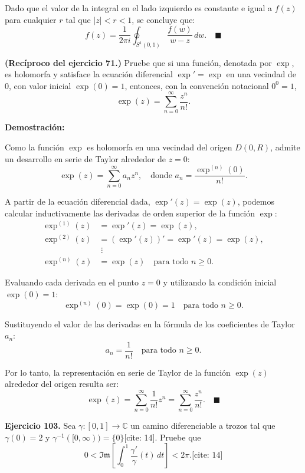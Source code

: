 \documentclass[11pt,a4paper]{article}
\theoremstyle{definition}
\theoremstyle{plain}
\theoremstyle{remark}
\begin{document}
	Dado que el valor de la integral en el lado izquierdo es constante e igual a $f(z)$ para cualquier $r$ tal que $|z| < r < 1$, se concluye que:
	\[
	f(z) = \frac{1}{2\pi i} \oint_{S^1(0, 1)} \frac{f(w)}{w - z} \, dw. \quad \blacksquare
	\]
	
	\noindent \textbf{(Recíproco del ejercicio 71.)} Pruebe que si una función, denotada por $\exp$, es holomorfa y satisface la ecuación diferencial $\exp' = \exp$ en una vecindad de $0$, con valor inicial $\exp(0) = 1$, entonces, con la convención notacional $0^0 = 1$,
	\[
	\exp(z) = \sum_{n=0}^{\infty} \frac{z^n}{n!}.
	\]
	
	\vspace{1em}
	\noindent \textbf{Demostración:}
	
	Como la función $\exp$ es holomorfa en una vecindad del origen $D(0, R)$, admite un desarrollo en serie de Taylor alrededor de $z = 0$:
	\[
	\exp(z) = \sum_{n=0}^{\infty} a_n z^n, \quad \text{donde } a_n = \frac{\exp^{(n)}(0)}{n!}.
	\]
	
	A partir de la ecuación diferencial dada, $\exp'(z) = \exp(z)$, podemos calcular inductivamente las derivadas de orden superior de la función $\exp$:
	\begin{align*}
		\exp^{(1)}(z) &= \exp'(z) = \exp(z), \\
		\exp^{(2)}(z) &= (\exp'(z))' = \exp'(z) = \exp(z), \\
		&\;\vdots \\
		\exp^{(n)}(z) &= \exp(z) \quad \text{para todo } n \geq 0.
	\end{align*}
	
	Evaluando cada derivada en el punto $z = 0$ y utilizando la condición inicial $\exp(0) = 1$:
	\[
	\exp^{(n)}(0) = \exp(0) = 1 \quad \text{para todo } n \geq 0.
	\]
	
	Sustituyendo el valor de las derivadas en la fórmula de los coeficientes de Taylor $a_n$:
	\[
	a_n = \frac{1}{n!} \quad \text{para todo } n \geq 0.
	\]
	
	Por lo tanto, la representación en serie de Taylor de la función $\exp(z)$ alrededor del origen resulta ser:
	\[
	\exp(z) = \sum_{n=0}^{\infty} \frac{1}{n!} z^n = \sum_{n=0}^{\infty} \frac{z^n}{n!}. \quad \blacksquare
	\]
	
	\noindent \textbf{Ejercicio 103.} Sea $\gamma : [0, 1] \to \mathbb{C}$ un camino diferenciable a trozos tal que $\gamma(0) = 2$ y $\gamma^{-1}([0, \infty)) = \{0\}$[cite: 14]. Pruebe que
	\[
	0 < \mathfrak{Im} \left[ \int_0^1 \frac{\gamma'}{\gamma}(t) \, dt \right] < 2\pi. \text{[cite: 14]}
	\]
	
\end{document}

